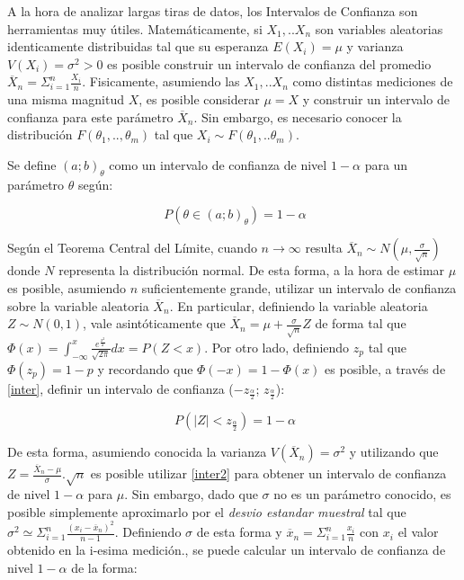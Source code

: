 \documentclass[11pt,a4paper]{article}
\begin{document}
A la hora de analizar largas tiras de datos, los Intervalos de Confianza son herramientas muy útiles. Matemáticamente, si $X_1,..X_n$ son variables aleatorias identicamente distribuidas tal que su esperanza $E(X_i) = \mu$ y varianza $V(X_i) = \sigma^2 > 0$ es posible construir un intervalo de confianza del promedio $\overline{X}_n = \Sigma_{i=1}^{n} \frac{X_i}{n}$. Fisicamente, asumiendo las $X_1,..X_n$ como distintas mediciones de una misma magnitud $X$, es posible considerar $\mu = X$ y construir un intervalo de confianza para este parámetro $\overline{X}_n$. Sin embargo, es necesario conocer la distribución $F(\theta_1,..,\theta_m)$ tal que $X_i \sim F(\theta_1,..\theta_m)$. 

Se define $(a;b)_{\theta}$ como un intervalo de confianza de nivel $1-\alpha$ para un parámetro $\theta$ según:

\begin{equation}\label{inter}
\ P(\theta\in(a;b)_{\theta})= 1-\alpha
\end{equation}

Según el Teorema Central del Límite, cuando $n\rightarrow\infty$ resulta $\overline{X}_n \sim N(\mu, \frac{\sigma}{\sqrt{n}})$ donde $N$ representa la distribución normal. De esta forma, a la hora de estimar $\mu$ es posible, asumiendo $n$ suficientemente grande, utilizar un intervalo de confianza sobre la variable aleatoria $\overline{X}_n$. En particular, definiendo la variable aleatoria $Z \sim N(0,1)$, vale asintóticamente que $\overline{X}_n = \mu + \frac{\sigma}{\sqrt{n}}Z$ de forma tal que $\Phi(x) = \int_{-\infty}^x \frac{e^{\frac{x^2}{2}}}{\sqrt{2\pi}} dx = P(Z<x)$. Por otro lado, definiendo $z_{p}$ tal que $\Phi(z_{p}) = 1-p$ y recordando que $\Phi(-x) = 1-\Phi(x)$ es posible, a través de \eqref{inter}, definir un intervalo de confianza ($-z_{\frac{\alpha}{2}}$; $z_{\frac{\alpha}{2}}$):

\begin{equation}\label{inter2}
\ P(|Z|<z_{\frac{\alpha}{2}})= 1-\alpha
\end{equation}

De esta forma, asumiendo conocida la varianza $V(\overline{X}_n) = \sigma^2$ y utilizando que $Z = \frac{\overline{X}_n-\mu}{\sigma}.\sqrt{n}$ es posible utilizar \eqref{inter2} para obtener un intervalo de confianza de nivel $1-\alpha$ para $\mu$. Sin embargo, dado que $\sigma$ no es un parámetro conocido, es posible simplemente aproximarlo por el \textit{desvio estandar muestral} tal que $\sigma^2 \simeq \Sigma_{i=1}^{n}\frac{(x_i-\overline{x}_n)^2}{n-1}$. Definiendo $\sigma$ de esta forma y $\overline{x}_n = \Sigma_{i=1}^{n} \frac{x_i}{n}$ con $x_i$ el valor obtenido en la i-esima medición., se puede calcular un intervalo de confianza de nivel $1-\alpha$ de la forma:
\end{document}
